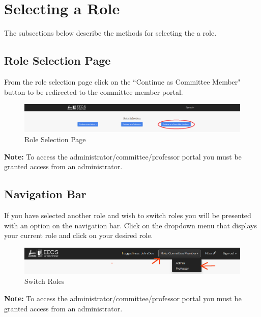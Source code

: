 \documentclass[fontsize=12pt,paper=letter,twoside]{scrartcl}
\begin{document}
\clearpage

\section{Selecting a Role}
The subsections below describe the methods for selecting the a role.

\subsection{Role Selection Page}
From the role selection page click on the ``Continue as Committee Member" button to be redirected to the committee member portal.

\begin{figure}[!htb]
\begin{center}
\includegraphics[width=.99\textwidth]{images/auth.png}
\end{center}
\caption{Role Selection Page}
\label{fig:role_selection1}
\end{figure}

\noindent \textbf{Note:} To access the administrator/committee/professor portal you must be granted access from an administrator.

\subsection{Navigation Bar}
If you have selected another role and wish to switch roles you will be presented with an option on the navigation bar. Click on the dropdown menu that displays your current role and click on your desired role.
\begin{figure}[!htb]
\begin{center}
\includegraphics[width=.99\textwidth]{images/role-selection2.png}
\end{center}
\caption{Switch Roles}
\label{fig:role_selection2}
\end{figure}

\noindent \textbf{Note:} To access the administrator/committee/professor portal you must be granted access from an administrator.
\end{document}
